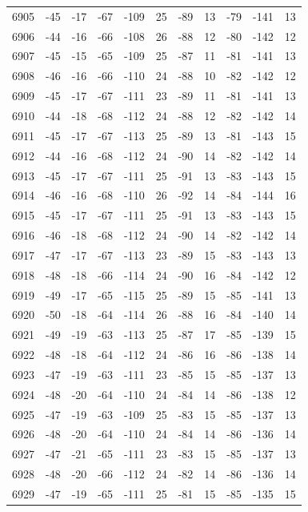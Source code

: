 \begin{table}[H]
\begin{tabular}{lllllllllll}
6905 & -45 & -17 & -67 & -109 & 25 & -89 & 13 & -79 & -141 & 13 \\
6906 & -44 & -16 & -66 & -108 & 26 & -88 & 12 & -80 & -142 & 12 \\
6907 & -45 & -15 & -65 & -109 & 25 & -87 & 11 & -81 & -141 & 13 \\
6908 & -46 & -16 & -66 & -110 & 24 & -88 & 10 & -82 & -142 & 12 \\
6909 & -45 & -17 & -67 & -111 & 23 & -89 & 11 & -81 & -141 & 13 \\
6910 & -44 & -18 & -68 & -112 & 24 & -88 & 12 & -82 & -142 & 14 \\
6911 & -45 & -17 & -67 & -113 & 25 & -89 & 13 & -81 & -143 & 15 \\
6912 & -44 & -16 & -68 & -112 & 24 & -90 & 14 & -82 & -142 & 14 \\
6913 & -45 & -17 & -67 & -111 & 25 & -91 & 13 & -83 & -143 & 15 \\
6914 & -46 & -16 & -68 & -110 & 26 & -92 & 14 & -84 & -144 & 16 \\
6915 & -45 & -17 & -67 & -111 & 25 & -91 & 13 & -83 & -143 & 15 \\
6916 & -46 & -18 & -68 & -112 & 24 & -90 & 14 & -82 & -142 & 14 \\
6917 & -47 & -17 & -67 & -113 & 23 & -89 & 15 & -83 & -143 & 13 \\
6918 & -48 & -18 & -66 & -114 & 24 & -90 & 16 & -84 & -142 & 12 \\
6919 & -49 & -17 & -65 & -115 & 25 & -89 & 15 & -85 & -141 & 13 \\
6920 & -50 & -18 & -64 & -114 & 26 & -88 & 16 & -84 & -140 & 14 \\
6921 & -49 & -19 & -63 & -113 & 25 & -87 & 17 & -85 & -139 & 15 \\
6922 & -48 & -18 & -64 & -112 & 24 & -86 & 16 & -86 & -138 & 14 \\
6923 & -47 & -19 & -63 & -111 & 23 & -85 & 15 & -85 & -137 & 13 \\
6924 & -48 & -20 & -64 & -110 & 24 & -84 & 14 & -86 & -138 & 12 \\
6925 & -47 & -19 & -63 & -109 & 25 & -83 & 15 & -85 & -137 & 13 \\
6926 & -48 & -20 & -64 & -110 & 24 & -84 & 14 & -86 & -136 & 14 \\
6927 & -47 & -21 & -65 & -111 & 23 & -83 & 15 & -85 & -137 & 13 \\
6928 & -48 & -20 & -66 & -112 & 24 & -82 & 14 & -86 & -136 & 14 \\
6929 & -47 & -19 & -65 & -111 & 25 & -81 & 15 & -85 & -135 & 15 \\

\end{tabular}
\end{table}
